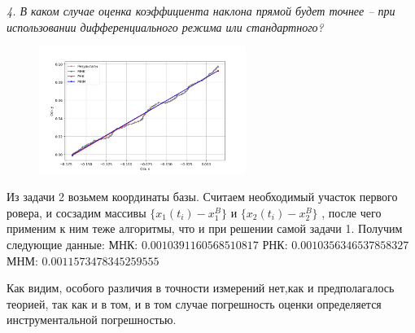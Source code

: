 \documentclass[a4paper,12pt]{article}
\begin{document}
\textit{4. В каком случае оценка коэффициента наклона прямой будет точнее – при использовании
дифференциального режима или стандартного? }

\begin{figure}
    \includegraphics[width=0.6\textwidth]{Figure_5.png}
\end{figure}
Из задачи 2 возьмем координаты базы. Считаем необходимый участок первого ровера, и сосзадим массивы $\{x_{1}(t_{i})-x_{1}^{B}\}$ и $\{x_{2}(t_{i})-x_{2}^{B}\}$ , после чего применим к ним теже алгоритмы, что и при решении самой задачи 1. Получим следующие данные:
\newline
МНК:  $0.0010391160568510817$\newline
РНК:  $0.0010356346537858327$\newline
МНМ:  $0.0011573478345259555$\newline

Как видим, особого различия в точности измерений нет,как и предполагалось теорией, так как и в том, и в том случае погрешность оценки определяется инструментальной погрешностью.
\end{document}
